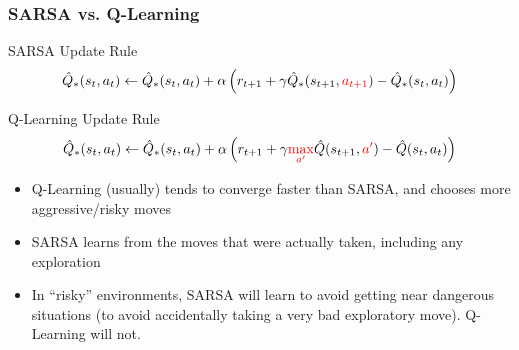 \documentclass[10pt,a4paper]{beamer}
\newcommand{\red}[1]{\textcolor{red}{#1}}
\begin{document}
\begin{frame}
	\frametitle{SARSA vs. Q-Learning}
	\begin{block}{SARSA Update Rule}
		$$
		\hat{Q}_*(s_t, a_t) \leftarrow  \hat{Q}_*(s_t, a_t) + \alpha 
		\left( r_{t+1} + \gamma \hat{Q}_*(s_{t+1}, \red{a_{t+1}}) - \hat{Q}_*(s_t, a_t) \right) 
		$$
	\end{block}
\begin{block}{Q-Learning Update Rule}
	$$
	\hat{Q}_*(s_t, a_t)  \leftarrow \hat{Q}_*(s_t,a_t)
	+ \alpha \left( 
	r_{t+1} + \gamma \red{\max_{a'}} \hat{Q}(s_{t+1}, \red{a'}) - \hat{Q}(s_t, a_t)
	\right)
	$$
\end{block}
\begin{itemize}
	\item Q-Learning (usually) tends to converge faster than SARSA, and chooses more
	aggressive/risky moves 
	\item SARSA learns from the moves that were actually
	taken, including any exploration
	\item In ``risky'' environments, SARSA will learn to avoid getting near dangerous situations
	(to avoid accidentally taking a very bad exploratory move). Q-Learning will not.
\end{itemize}
\end{frame}


	


	
\end{document}
